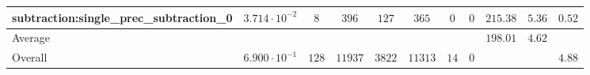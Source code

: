\begin{tabular}{|l|c|c|c|c|c|c|c|c|c|c|}
subtraction:single\_prec\_subtraction\_0         & $ 3.714 \cdot 10^{-2} $ & $ 8      $ & $ 396   $ & $ 127  $ & $ 365   $ & $ 0  $ & $ 0 $ & $ 215.38      $ & $ 5.36    $ & $ 0.52    $ \\
\hline
Average                                          & $                     $ & $        $ & $       $ & $      $ & $       $ & $    $ & $   $ & $ 198.01      $ & $ 4.62    $ & $         $ \\
\hline
Overall                                          & $ 6.900 \cdot 10^{-1} $ & $ 128    $ & $ 11937 $ & $ 3822 $ & $ 11313 $ & $ 14 $ & $ 0 $ & $             $ & $         $ & $ 4.88    $ \\
\hline
\end{tabular}
